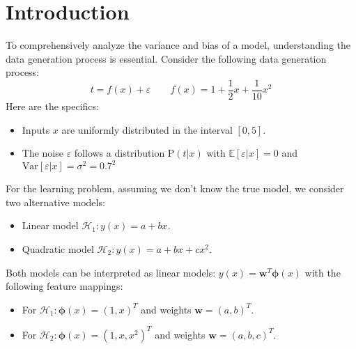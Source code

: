 \section{Introduction}

To comprehensively analyze the variance and bias of a model, understanding the data generation process is essential. 
Consider the following data generation process:
\[t=f(x)+\varepsilon \qquad f(x)=1+\dfrac{1}{2}x+\dfrac{1}{10}x^2\]
Here are the specifics:
\begin{itemize}
    \item Inputs $x$ are uniformly distributed in the interval $[0, 5]$.
    \item The noise $\varepsilon$ follows a distribution $\text{P}(t|x)$ with $\mathbb{E}[\varepsilon|x] = 0$ and $\text{Var}[\varepsilon|x] = \sigma^2 = 0.7^2$
\end{itemize}

For the learning problem, assuming we don't know the true model, we consider two alternative models:
\begin{itemize}
    \item Linear model $\mathcal{H}_1:y(x)=a+bx$.
    \item Quadratic model $\mathcal{H}_2:y(x)=a+bx+cx^2$.
\end{itemize}
Both models can be interpreted as linear models: $y(x) = \textbf{w}^T\boldsymbol{\phi}(x)$ with the following feature mappings:
\begin{itemize}
    \item For $\mathcal{H}_1:\boldsymbol{\phi}(x)=\left(1,x\right)^T$ and weights $\textbf{w}=(a,b)^T$.
    \item For $\mathcal{H}_2:\boldsymbol{\phi}(x)=\left(1,x,x^2\right)^T$ and weights $\textbf{w}=(a,b,c)^T$.
\end{itemize}